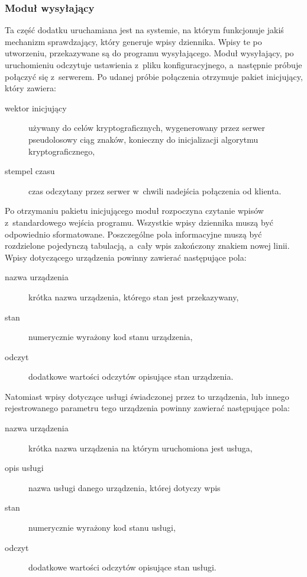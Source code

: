 
\subsubsection[Moduł wysyłający][Moduł wysyłający]{Moduł wysyłający}
\label{subsubsec:modulWysylajacy}

Ta część dodatku uruchamiana jest na systemie, na którym funkcjonuje
jakiś mechanizm sprawdzający, który generuje wpisy dziennika. Wpisy te
po utworzeniu, przekazywane są do programu wysyłającego. Moduł
wysyłający, po uruchomieniu odczytuje ustawienia z~pliku
konfiguracyjnego, a~następnie próbuje połączyć się z~serwerem. Po
udanej próbie połączenia otrzymuje pakiet inicjujący, który zawiera:

\begin{description}
\item[wektor inicjujący] używany do celów kryptograficznych,
  wygenerowany przez serwer pseudolosowy ciąg znaków, konieczny do
  inicjalizacji algorytmu kryptograficznego,
\item[stempel czasu] czas odczytany przez serwer w~chwili nadejścia
  połączenia od klienta.
\end{description} 

Po otrzymaniu pakietu inicjującego moduł rozpoczyna czytanie wpisów
z~standardowego wejścia programu. Wszystkie wpisy dziennika muszą być
odpowiednio sformatowane. Poszczególne pola informacyjne muszą być
rozdzielone pojedynczą tabulacją, a~cały wpis zakończony znakiem
nowej linii. Wpisy dotyczącego urządzenia powinny zawierać następujące
pola:

\begin{description}
\item[nazwa urządzenia] krótka nazwa urządzenia, którego stan jest
  przekazywany,
\item[stan] numerycznie wyrażony kod stanu urządzenia,
\item[odczyt] dodatkowe wartości odczytów opisujące stan urządzenia.
\end{description}

Natomiast wpisy dotyczące usługi świadczonej przez to urządzenia, lub
innego rejestrowanego parametru tego urządzenia powinny zawierać
następujące pola:

\begin{description}
\item[nazwa urządzenia] krótka nazwa urządzenia na którym uruchomiona
  jest usługa,
\item[opis usługi] nazwa usługi danego urządzenia, której dotyczy wpis
\item[stan] numerycznie wyrażony kod stanu usługi,
\item[odczyt] dodatkowe wartości odczytów opisujące stan usługi.
\end{description}

